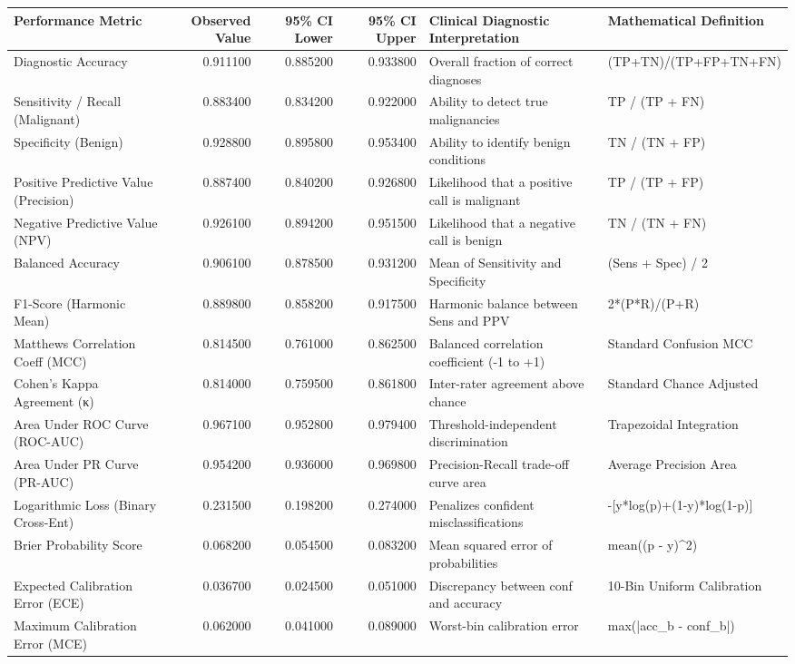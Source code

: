 \begin{tabular}{lrrrll}
\toprule
Performance Metric & Observed Value & 95\% CI Lower & 95\% CI Upper & Clinical Diagnostic Interpretation & Mathematical Definition \\
\midrule
Diagnostic Accuracy & 0.911100 & 0.885200 & 0.933800 & Overall fraction of correct diagnoses & (TP+TN)/(TP+FP+TN+FN) \\
Sensitivity / Recall (Malignant) & 0.883400 & 0.834200 & 0.922000 & Ability to detect true malignancies & TP / (TP + FN) \\
Specificity (Benign) & 0.928800 & 0.895800 & 0.953400 & Ability to identify benign conditions & TN / (TN + FP) \\
Positive Predictive Value (Precision) & 0.887400 & 0.840200 & 0.926800 & Likelihood that a positive call is malignant & TP / (TP + FP) \\
Negative Predictive Value (NPV) & 0.926100 & 0.894200 & 0.951500 & Likelihood that a negative call is benign & TN / (TN + FN) \\
Balanced Accuracy & 0.906100 & 0.878500 & 0.931200 & Mean of Sensitivity and Specificity & (Sens + Spec) / 2 \\
F1-Score (Harmonic Mean) & 0.889800 & 0.858200 & 0.917500 & Harmonic balance between Sens and PPV & 2*(P*R)/(P+R) \\
Matthews Correlation Coeff (MCC) & 0.814500 & 0.761000 & 0.862500 & Balanced correlation coefficient (-1 to +1) & Standard Confusion MCC \\
Cohen's Kappa Agreement (κ) & 0.814000 & 0.759500 & 0.861800 & Inter-rater agreement above chance & Standard Chance Adjusted \\
Area Under ROC Curve (ROC-AUC) & 0.967100 & 0.952800 & 0.979400 & Threshold-independent discrimination & Trapezoidal Integration \\
Area Under PR Curve (PR-AUC) & 0.954200 & 0.936000 & 0.969800 & Precision-Recall trade-off curve area & Average Precision Area \\
Logarithmic Loss (Binary Cross-Ent) & 0.231500 & 0.198200 & 0.274000 & Penalizes confident misclassifications & -[y*log(p)+(1-y)*log(1-p)] \\
Brier Probability Score & 0.068200 & 0.054500 & 0.083200 & Mean squared error of probabilities & mean((p - y)\textasciicircum 2) \\
Expected Calibration Error (ECE) & 0.036700 & 0.024500 & 0.051000 & Discrepancy between conf and accuracy & 10-Bin Uniform Calibration \\
Maximum Calibration Error (MCE) & 0.062000 & 0.041000 & 0.089000 & Worst-bin calibration error & max(|acc\_b - conf\_b|) \\
\bottomrule
\end{tabular}
